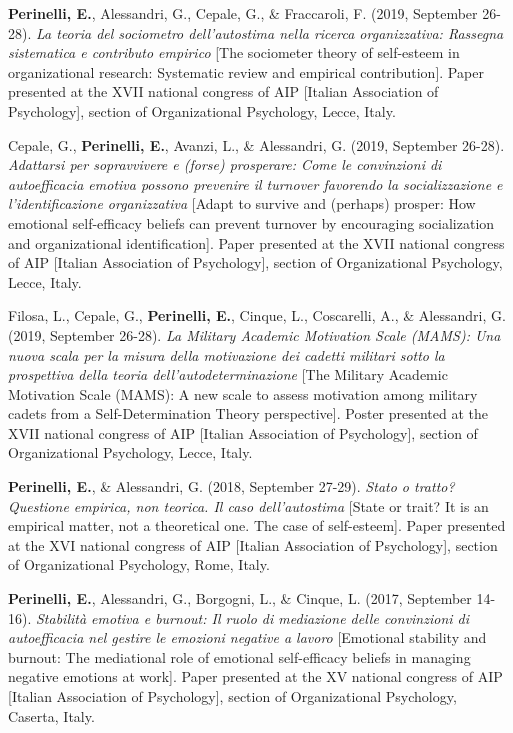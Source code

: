 \documentclass[hidelinks, letterpaper,10pt]{article} %
\begin{document}
\begin{etaremune}
    \item \textbf{Perinelli, E.}, Alessandri, G., Cepale, G., \& Fraccaroli, F. (2019, September 26-28). \textit{La teoria del sociometro dell’autostima nella ricerca organizzativa: Rassegna sistematica e contributo empirico} [The sociometer theory of self-esteem in organizational research: Systematic review and empirical contribution]. Paper presented at the XVII national congress of AIP [Italian Association of Psychology], section of Organizational Psychology, Lecce, Italy.

    \item Cepale, G., \textbf{Perinelli, E.}, Avanzi, L., \& Alessandri, G. (2019, September 26-28). \textit{Adattarsi per sopravvivere e (forse) prosperare: Come le convinzioni di autoefficacia emotiva possono prevenire il turnover favorendo la socializzazione e l’identificazione organizzativa} [Adapt to survive and (perhaps) prosper: How emotional self-efficacy beliefs can prevent turnover by encouraging socialization and organizational identification]. Paper presented at the XVII national congress of AIP [Italian Association of Psychology], section of Organizational Psychology, Lecce, Italy.

    \item Filosa, L., Cepale, G., \textbf{Perinelli, E.}, Cinque, L., Coscarelli, A., \& Alessandri, G. (2019, September 26-28). \textit{La Military Academic Motivation Scale (MAMS): Una nuova scala per la misura della motivazione dei cadetti militari sotto la prospettiva della teoria dell’autodeterminazione} [The Military Academic Motivation Scale (MAMS): A new scale to assess motivation among military cadets from a Self-Determination Theory perspective]. Poster presented at the XVII national congress of AIP [Italian Association of Psychology], section of Organizational Psychology, Lecce, Italy.

    \item \textbf{Perinelli, E.}, \& Alessandri, G. (2018, September 27-29). \textit{Stato o tratto? Questione empirica, non teorica. Il caso dell’autostima} [State or trait? It is an empirical matter, not a theoretical one. The case of self-esteem]. Paper presented at the XVI national congress of AIP [Italian Association of Psychology], section of Organizational Psychology, Rome, Italy.

    \item \textbf{Perinelli, E.}, Alessandri, G., Borgogni, L., \& Cinque, L. (2017, September 14-16). \textit{Stabilità emotiva e burnout: Il ruolo di mediazione delle convinzioni di autoefficacia nel gestire le emozioni negative a lavoro} [Emotional stability and burnout: The mediational role of emotional self-efficacy beliefs in managing negative emotions at work]. Paper presented at the XV national congress of AIP [Italian Association of Psychology], section of Organizational Psychology, Caserta, Italy.


\end{etaremune}
\end{document}
